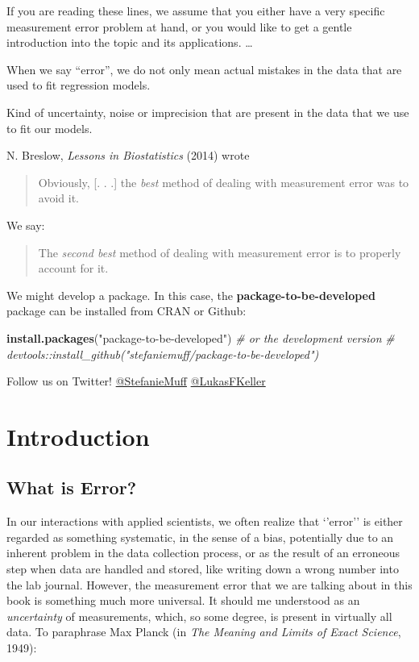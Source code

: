 \documentclass[]{book}
\newenvironment{Shaded}{\begin{snugshade}}{\end{snugshade}}
\newcommand{\KeywordTok}[1]{\textcolor[rgb]{0.13,0.29,0.53}{\textbf{#1}}}
\newcommand{\StringTok}[1]{\textcolor[rgb]{0.31,0.60,0.02}{#1}}
\newcommand{\CommentTok}[1]{\textcolor[rgb]{0.56,0.35,0.01}{\textit{#1}}}
\newcommand{\NormalTok}[1]{#1}
\theoremstyle{definition}
\theoremstyle{definition}
\theoremstyle{definition}
\theoremstyle{remark}
\begin{document}
If you are reading these lines, we assume that you either have a very
specific measurement error problem at hand, or you would like to get a
gentle introduction into the topic and its applications. \ldots{}

When we say ``error'', we do not only mean actual mistakes in the data
that are used to fit regression models.

Kind of uncertainty, noise or imprecision that are present in the data
that we use to fit our models.

N. Breslow, \emph{Lessons in Biostatistics} (2014) \citep{breslow2014}
wrote

\begin{quote}
Obviously, {[}. . .{]} the \emph{best} method of dealing with
measurement error was to avoid it.
\end{quote}

We say:

\begin{quote}
The \emph{second best} method of dealing with measurement error is to
properly account for it.
\end{quote}

We might develop a package. In this case, the
\textbf{package-to-be-developed} package can be installed from CRAN or
Github:

\begin{Shaded}
\begin{Highlighting}[]
\KeywordTok{install.packages}\NormalTok{(}\StringTok{"package-to-be-developed"}\NormalTok{)}
\CommentTok{# or the development version}
\CommentTok{# devtools::install_github("stefaniemuff/package-to-be-developed")}
\end{Highlighting}
\end{Shaded}

Follow us on Twitter!
\href{https://twitter.com/stefaniemuff}{@StefanieMuff}
\href{https://twitter.com/lukasfkeller}{@LukasFKeller}

\chapter{Introduction}\label{intro}

\section{What is Error?}\label{what-is-error}

In our interactions with applied scientists, we often realize that
`'error'' is either regarded as something systematic, in the sense of a
bias, potentially due to an inherent problem in the data collection
process, or as the result of an erroneous step when data are handled and
stored, like writing down a wrong number into the lab journal. However,
the measurement error that we are talking about in this book is
something much more universal. It should me understood as an
\emph{uncertainty} of measurements, which, so some degree, is present in
virtually all data. To paraphrase Max Planck (in \emph{The Meaning and
Limits of Exact Science}, 1949):
\end{document}
